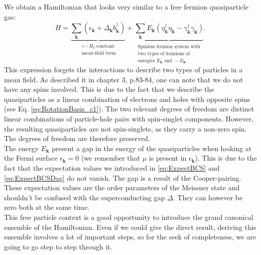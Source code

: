 \documentclass[../main.tex]{subfile}
\begin{document}
We obtain a Hamiltonian that looks very similar to a free fermion quasiparticle gas:
\begin{equation}\label{eq:HamiltonianBCS2}
H = \underbrace{\sum_{\bm{k}} \left(\epsilon_{\bm{k}} + \Delta_{\bm{k}} b_{\bm{k}}^{\dagger}\right)}_{\substack{=:H_0~ \text{constant}\\\text{ mean-field term}}}  
+ \underbrace{\sum_{\bm{k}} E_{\bm{k}}\left(\eta_{\bm{k}}^{\dagger}\eta_{\bm{k}} - 
\gamma_{\bm{k}}^{\dagger}\gamma_{\bm{k}}\right)}_{\substack{\text{Spinless fermion system with} 
\\\text{two types of fermions of}\\\text{energies }E_{\bm{k}}\text{ and }-E_{\bm{k}}.}}.
\end{equation}
This expression forgets the interactions to describe two types of particles in a mean field. 
As \cite{FossheimSudbo2004} described it in chapter 3, p.83-84, one can note that we do not have any spins involved. This is due
to the fact that we describe the quasiparticles as a linear combination of electrons and holes with opposite spins (see Eq. \ref{eq:RotationBasis_c1}).
The two relevant degrees of freedom are distinct linear combinations of particle-hole 
pairs with spin-singlet components. However, the resulting quasiparticles are not spin-singlets, as they carry a non-zero spin.
The degrees of freedom are therefore preserved.\\

The energy $E_{\bm{k}}$ present a gap in the energy of the quasiparticles when looking at the Fermi surface $\epsilon_{\bm{k}}=0$ (we remember that $\mu$ is present in $\epsilon_{\bm{k}}$).
This is due to the fact that the expectation values we introduced in \ref{eq:ExpectBCS} and \ref{eq:ExpectBCSDag} do not vanish. The gap is a result of the Cooper-pairing. These expectation values
are the order parameters of the Meissner state and shouldn't be confused with the superconducting gap $\Delta$. They can however be zero both at the same time. \\

This free particle context is a good opportunity to introduce the grand canonical ensemble of the Hamiltonian. 
Even if we could give the direct result, deriving this ensemble involves a lot of important steps, so for
the seek of completeness, we are going to go step to step through it.\\
\end{document}
